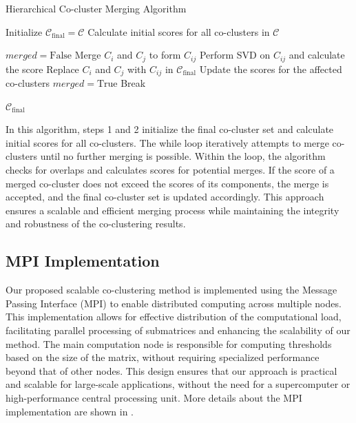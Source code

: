 \documentclass[journal]{IEEEtran}
\begin{document}
\begin{algorithm}[!t]
  \caption{Hierarchical Co-cluster Merging Algorithm}\label{alg:hierarchical_merging}
  \begin{algorithmic}[1]

    \STATE Initialize $\mathcal{C}_{\text{final}} = \mathcal{C}$
    \STATE Calculate initial scores for all co-clusters in $\mathcal{C}$

    \STATE $merged = \text{False}$
    \STATE Merge $C_i$ and $C_j$ to form $C_{ij}$
    \STATE Perform SVD on $C_{ij}$ and calculate the score
    \STATE Replace $C_i$ and $C_j$ with $C_{ij}$ in $\mathcal{C}_{\text{final}}$
    \STATE Update the scores for the affected co-clusters
    \STATE $merged = \text{True}$
    \ENDIF
    \ENDIF
    \ENDFOR
    \STATE Break
    \ENDIF
    \ENDWHILE

    \RETURN $\mathcal{C}_{\text{final}}$
  \end{algorithmic}
\end{algorithm}

In this algorithm, steps 1 and 2 initialize the final co-cluster set and calculate initial scores for all co-clusters. The while loop iteratively attempts to merge co-clusters until no further merging is possible. Within the loop, the algorithm checks for overlaps and calculates scores for potential merges. If the score of a merged co-cluster does not exceed the scores of its components, the merge is accepted, and the final co-cluster set is updated accordingly. This approach ensures a scalable and efficient merging process while maintaining the integrity and robustness of the co-clustering results.

\subsection{MPI Implementation}

Our proposed scalable co-clustering method is implemented using the Message Passing Interface (MPI) to enable distributed computing across multiple nodes. This implementation allows for effective distribution of the computational load, facilitating parallel processing of submatrices and enhancing the scalability of our method. The main computation node is responsible for computing thresholds based on the size of the matrix, without requiring specialized performance beyond that of other nodes. This design ensures that our approach is practical and scalable for large-scale applications, without the need for a supercomputer or high-performance central processing unit.
More details about the MPI implementation are shown in .
\end{document}
